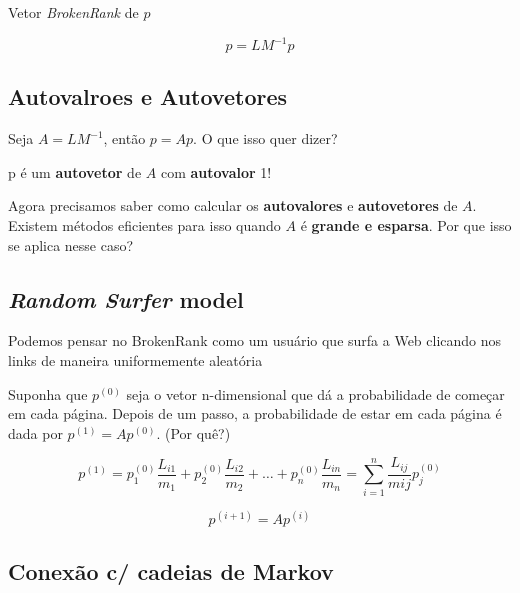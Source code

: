 \documentclass[
  letterpaper,
  DIV=11,
  numbers=noendperiod]{scrartcl}
\begin{document}
Vetor \emph{BrokenRank} de \(p\)

\[ p = LM^{-1}p\]

\hypertarget{autovalroes-e-autovetores}{%
\subsection{Autovalroes e Autovetores}\label{autovalroes-e-autovetores}}

Seja \(A = LM^{-1}\), então \(p = Ap\). O que isso quer dizer?

\begin{tcolorbox}[enhanced jigsaw, colbacktitle=quarto-callout-important-color!10!white, colframe=quarto-callout-important-color-frame, opacityback=0, breakable, toprule=.15mm, leftrule=.75mm, titlerule=0mm, coltitle=black, bottomtitle=1mm, colback=white, toptitle=1mm, title=\textcolor{quarto-callout-important-color}{\faExclamation}\hspace{0.5em}{Important}, arc=.35mm, rightrule=.15mm, bottomrule=.15mm, left=2mm, opacitybacktitle=0.6]
p é um \textbf{autovetor} de \(A\) com \textbf{autovalor} 1!
\end{tcolorbox}

Agora precisamos saber como calcular os \textbf{autovalores} e
\textbf{autovetores} de \(A\). Existem métodos eficientes para isso
quando \(A\) é \textbf{grande e esparsa}. Por que isso se aplica nesse
caso?

\hypertarget{random-surfer-model}{%
\subsection{\texorpdfstring{\emph{Random Surfer}
model}{Random Surfer model}}\label{random-surfer-model}}

Podemos pensar no BrokenRank como um usuário que surfa a Web clicando
nos links de maneira uniformemente aleatória

Suponha que \(p^{(0)}\) seja o vetor n-dimensional que dá a
probabilidade de começar em cada página. Depois de um passo, a
probabilidade de estar em cada página é dada por \(p^{(1)} = Ap^{(0)}\).
(Por quê?)

\[p^{(1)} = p_1^{(0)}\frac{L_{i1}}{m_1} +  p_2^{(0)}\frac{L_{i2}}{m_2} + \ldots + p_n^{(0)}\frac{L_{in}}{m_n} = \sum_{i=1}^n\frac{L_{ij}}{mij}p_j^{(0)}\]

\[p^{(i+1)} = A p^{(i)}\]

\hypertarget{conexuxe3o-c-cadeias-de-markov}{%
\subsection{Conexão c/ cadeias de
Markov}\label{conexuxe3o-c-cadeias-de-markov}}
\end{document}
